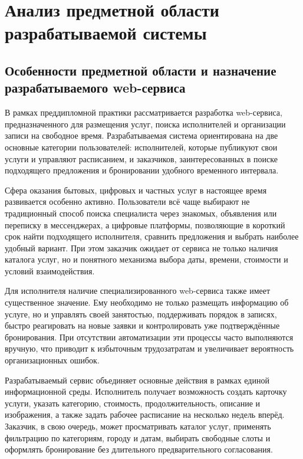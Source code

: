 \section{Анализ предметной области разрабатываемой системы}

\subsection{Особенности предметной области и назначение разрабатываемого web-сервиса}

В рамках преддипломной практики рассматривается разработка web-сервиса, предназначенного для размещения услуг, поиска исполнителей и организации записи на свободное время. Разрабатываемая система ориентирована на две основные категории пользователей: исполнителей, которые публикуют свои услуги и управляют расписанием, и заказчиков, заинтересованных в поиске подходящего предложения и бронировании удобного временного интервала.

Сфера оказания бытовых, цифровых и частных услуг в настоящее время развивается особенно активно. Пользователи всё чаще выбирают не традиционный способ поиска специалиста через знакомых, объявления или переписку в мессенджерах, а цифровые платформы, позволяющие в короткий срок найти подходящего исполнителя, сравнить предложения и выбрать наиболее удобный вариант. При этом заказчик ожидает от сервиса не только наличия каталога услуг, но и понятного механизма выбора даты, времени, стоимости и условий взаимодействия.

Для исполнителя наличие специализированного web-сервиса также имеет существенное значение. Ему необходимо не только размещать информацию об услуге, но и управлять своей занятостью, поддерживать порядок в записях, быстро реагировать на новые заявки и контролировать уже подтверждённые бронирования. При отсутствии автоматизации эти процессы часто выполняются вручную, что приводит к избыточным трудозатратам и увеличивает вероятность организационных ошибок.

Разрабатываемый сервис объединяет основные действия в рамках единой информационной среды. Исполнитель получает возможность создать карточку услуги, указать категорию, стоимость, продолжительность, описание и изображения, а также задать рабочее расписание на несколько недель вперёд. Заказчик, в свою очередь, может просматривать каталог услуг, применять фильтрацию по категориям, городу и датам, выбирать свободные слоты и оформлять бронирование без длительного предварительного согласования.

